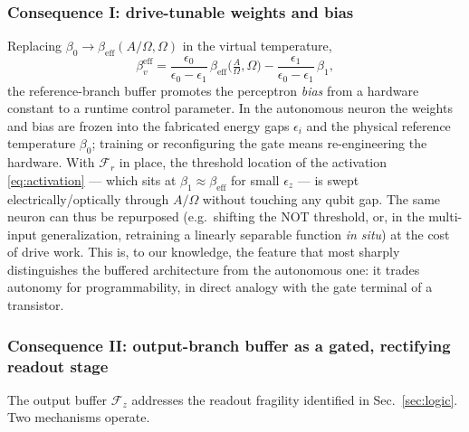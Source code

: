 \documentclass[11pt,a4paper]{article}
\theoremstyle{definition}
\theoremstyle{remark}
\begin{document}
\subsubsection{Consequence I: drive-tunable weights and bias}
\label{sec:tunable-weights}
Replacing $\beta_0 \to \beta_{\mathrm{eff}}(A/\Omega,\Omega)$ in the
virtual temperature,
\begin{equation}
\beta_v^{\mathrm{eff}}
= \frac{\epsilon_0}{\epsilon_0-\epsilon_1}\,
\beta_{\mathrm{eff}}\!\Big(\tfrac{A}{\Omega},\Omega\Big)
- \frac{\epsilon_1}{\epsilon_0-\epsilon_1}\,\beta_1 ,
\label{eq:betav_eff}
\end{equation}
the reference-branch buffer promotes the perceptron \emph{bias} from a
hardware constant to a runtime control parameter. In the autonomous
neuron the weights and bias are frozen into the fabricated energy gaps
$\epsilon_i$ and the physical reference temperature $\beta_0$; training
or reconfiguring the gate means re-engineering the hardware. With
$\mathcal{F}_r$ in place, the threshold location of the activation
\eqref{eq:activation} --- which sits at
$\beta_1 \approx \beta_{\mathrm{eff}}$ for small $\epsilon_z$ --- is
swept electrically/optically through $A/\Omega$ without touching any
qubit gap. The same neuron can thus be repurposed (e.g.\ shifting the
NOT threshold, or, in the multi-input generalization, retraining a
linearly separable function \emph{in situ}) at the cost of drive work.
This is, to our knowledge, the feature that most sharply distinguishes
the buffered architecture from the autonomous one: it trades autonomy
for programmability, in direct analogy with the gate terminal of a
transistor.
 
\subsubsection{Consequence II: output-branch buffer as a gated,
rectifying readout stage}
\label{sec:output-buffer}
The output buffer $\mathcal{F}_z$ addresses the readout fragility
identified in Sec.~\ref{sec:logic}. Two mechanisms operate.
 
\end{document}
